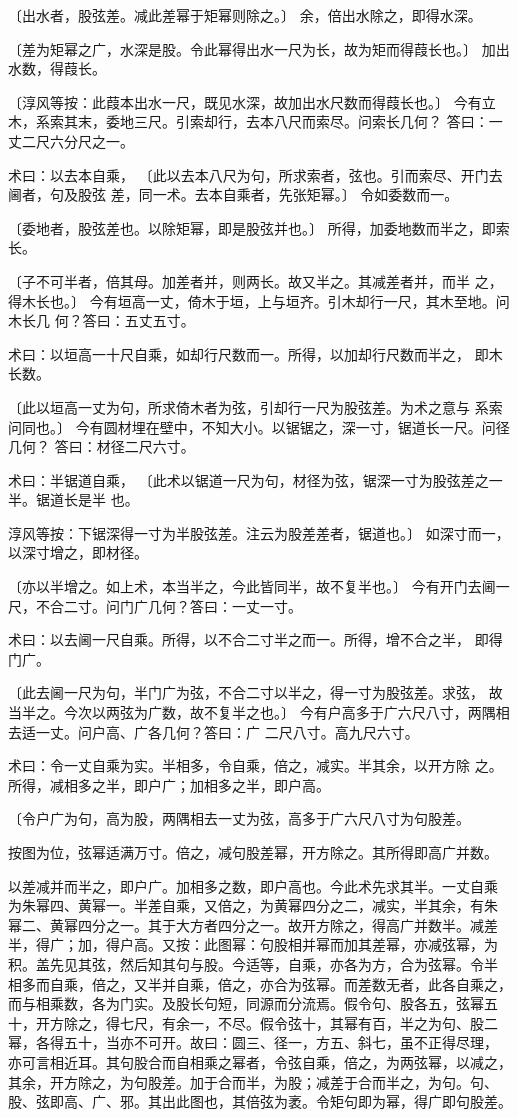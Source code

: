 \documentclass[a4paper,12pt,UTF8,twoside]{ctexbook}
\begin{document}
〔出水者，股弦差。减此差幂于矩幂则除之。〕 余，倍出水除之，即得水深。

〔差为矩幂之广，水深是股。令此幂得出水一尺为长，故为矩而得葭长也。〕 加出水数，得葭长。

〔淳风等按：此葭本出水一尺，既见水深，故加出水尺数而得葭长也。〕 今有立木，系索其末，委地三尺。引索却行，去本八尺而索尽。问索长几何？ 答曰：一丈二尺六分尺之一。

术曰：以去本自乘， 〔此以去本八尺为句，所求索者，弦也。引而索尽、开门去阃者，句及股弦 差，同一术。去本自乘者，先张矩幂。〕 令如委数而一。

〔委地者，股弦差也。以除矩幂，即是股弦并也。〕 所得，加委地数而半之，即索长。

〔子不可半者，倍其母。加差者并，则两长。故又半之。其减差者并，而半 之，得木长也。〕 今有垣高一丈，倚木于垣，上与垣齐。引木却行一尺，其木至地。问木长几 何？答曰：五丈五寸。

术曰：以垣高一十尺自乘，如却行尺数而一。所得，以加却行尺数而半之， 即木长数。

〔此以垣高一丈为句，所求倚木者为弦，引却行一尺为股弦差。为术之意与 系索问同也。〕 今有圆材埋在壁中，不知大小。以锯锯之，深一寸，锯道长一尺。问径几何？ 答曰：材径二尺六寸。

术曰：半锯道自乘， 〔此术以锯道一尺为句，材径为弦，锯深一寸为股弦差之一半。锯道长是半 也。

淳风等按：下锯深得一寸为半股弦差。注云为股差差者，锯道也。〕 如深寸而一，以深寸增之，即材径。

〔亦以半增之。如上术，本当半之，今此皆同半，故不复半也。〕 今有开门去阃一尺，不合二寸。问门广几何？答曰：一丈一寸。

术曰：以去阃一尺自乘。所得，以不合二寸半之而一。所得，增不合之半， 即得门广。

〔此去阃一尺为句，半门广为弦，不合二寸以半之，得一寸为股弦差。求弦， 故当半之。今次以两弦为广数，故不复半之也。〕 今有户高多于广六尺八寸，两隅相去适一丈。问户高、广各几何？答曰：广 二尺八寸。高九尺六寸。

术曰：令一丈自乘为实。半相多，令自乘，倍之，减实。半其余，以开方除 之。所得，减相多之半，即户广；加相多之半，即户高。

〔令户广为句，高为股，两隅相去一丈为弦，高多于广六尺八寸为句股差。

按图为位，弦幂适满万寸。倍之，减句股差幂，开方除之。其所得即高广并数。

以差减并而半之，即户广。加相多之数，即户高也。今此术先求其半。一丈自乘 为朱幂四、黄幂一。半差自乘，又倍之，为黄幂四分之二，减实，半其余，有朱 幂二、黄幂四分之一。其于大方者四分之一。故开方除之，得高广并数半。减差 半，得广；加，得户高。又按：此图幂：句股相并幂而加其差幂，亦减弦幂，为 积。盖先见其弦，然后知其句与股。今适等，自乘，亦各为方，合为弦幂。令半 相多而自乘，倍之，又半并自乘，倍之，亦合为弦幂。而差数无者，此各自乘之， 而与相乘数，各为门实。及股长句短，同源而分流焉。假令句、股各五，弦幂五 十，开方除之，得七尺，有余一，不尽。假令弦十，其幂有百，半之为句、股二 幂，各得五十，当亦不可开。故曰：圆三、径一，方五、斜七，虽不正得尽理， 亦可言相近耳。其句股合而自相乘之幂者，令弦自乘，倍之，为两弦幂，以减之， 其余，开方除之，为句股差。加于合而半，为股；减差于合而半之，为句。句、 股、弦即高、广、邪。其出此图也，其倍弦为袤。令矩句即为幂，得广即句股差。
\end{document}
